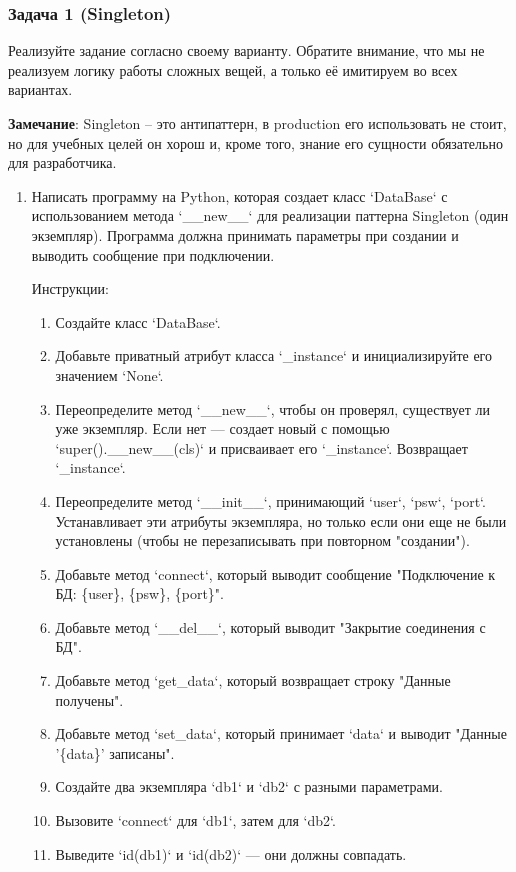 \subsubsection {Задача 1 (Singleton)}

Реализуйте задание согласно своему варианту. Обратите внимание, что мы
не реализуем логику работы сложных вещей, а только её имитируем во всех 
вариантах. 

\textbf{Замечание}: Singleton -- это антипаттерн, в production его использовать
не стоит, но для учебных целей он хорош и, кроме того, знание его
сущности обязательно для разработчика.

\begin{enumerate}

\item Написать программу на Python, которая создает класс `DataBase` с использованием метода `\_\_new\_\_` для реализации паттерна Singleton (один экземпляр). Программа должна принимать параметры при создании и выводить сообщение при подключении.

Инструкции:
\begin{enumerate}
    \item Создайте класс `DataBase`.
    \item Добавьте приватный атрибут класса `\_instance` и инициализируйте его значением `None`.
    \item Переопределите метод `\_\_new\_\_`, чтобы он проверял, существует ли уже экземпляр. Если нет — создает новый с помощью `super().\_\_new\_\_(cls)` и присваивает его `\_instance`. Возвращает `\_instance`.
    \item Переопределите метод `\_\_init\_\_`, принимающий `user`, `psw`, `port`. Устанавливает эти атрибуты экземпляра, но только если они еще не были установлены (чтобы не перезаписывать при повторном "создании").
    \item Добавьте метод `connect`, который выводит сообщение "Подключение к БД: \{user\}, \{psw\}, \{port\}".
    \item Добавьте метод `\_\_del\_\_`, который выводит "Закрытие соединения с БД".
    \item Добавьте метод `get\_data`, который возвращает строку "Данные получены".
    \item Добавьте метод `set\_data`, который принимает `data` и выводит "Данные '\{data\}' записаны".
    \item Создайте два экземпляра `db1` и `db2` с разными параметрами.
    \item Вызовите `connect` для `db1`, затем для `db2`.
    \item Выведите `id(db1)` и `id(db2)` — они должны совпадать.
\end{enumerate}


\end{enumerate}
